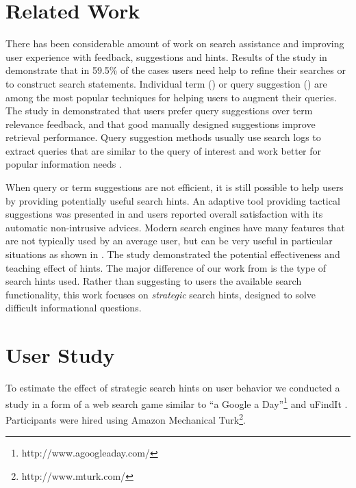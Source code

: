 \documentclass{sig-alternate}
\begin{document}
\section{Related Work}

There has been considerable amount of work on search assistance and improving user experience with feedback, suggestions and hints.
Results of the study in \cite{xie2009understanding} demonstrate that in 59.5\% of the cases users need help to refine their searches or to construct search statements.
Individual term (\cite{ruthven2003survey}) or query suggestion (\cite{Bhatia:2011:QSA:2009916.2010023, Cao:2008:CQS:1401890.1401995,Jones:2006:GQS:1135777.1135835}) are among the most popular techniques for helping users to augment their queries.
The study in \cite{Kelly:2009:CQT:1571941.1572006} demonstrated that users prefer query suggestions over term relevance feedback, and that good manually designed suggestions improve retrieval performance.
Query suggestion methods usually use search logs to extract queries that are similar to the query of interest and work better for popular information needs \cite{Bhatia:2011:QSA:2009916.2010023}.

When query or term suggestions are not efficient, it is still possible to help users by providing potentially useful search hints.
An adaptive tool providing tactical suggestions was presented in \cite{Kriewel2010} and users reported overall satisfaction with its automatic non-intrusive advices.
Modern search engines have many features that are not typically used by an average user, but can be very useful in particular situations as shown in \cite{Moraveji:2011:MIU:2009916.2009966}. The study demonstrated the potential effectiveness and teaching effect of hints.
The major difference of our work from \cite{Moraveji:2011:MIU:2009916.2009966} is the type of search hints used.
Rather than suggesting to users the available search functionality, this work focuses on {\em strategic} search hints, designed to solve difficult informational questions.

\section{User Study}

To estimate the effect of strategic search hints on user behavior we conducted a study in a form of a web search game similar to ``a Google a Day''\footnote{http://www.agoogleaday.com/} and uFindIt \cite{Ageev:2011:FYG:2009916.2009965}. Participants were hired using Amazon Mechanical Turk\footnote{http://www.mturk.com/}. 
\end{document}
